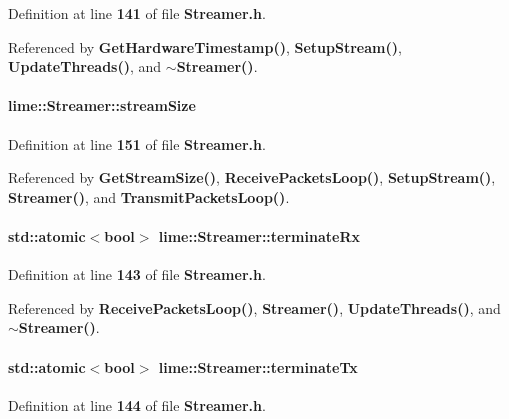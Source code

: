 Definition at line {\bf 141} of file {\bf Streamer.\+h}.



Referenced by {\bf Get\+Hardware\+Timestamp()}, {\bf Setup\+Stream()}, {\bf Update\+Threads()}, and {\bf $\sim$\+Streamer()}.

\paragraph[{stream\+Size}]{ lime\+::\+Streamer\+::stream\+Size}\label{classlime_1_1Streamer_a09f4d312f6ee5f04494455fe2fe7b482}


Definition at line {\bf 151} of file {\bf Streamer.\+h}.



Referenced by {\bf Get\+Stream\+Size()}, {\bf Receive\+Packets\+Loop()}, {\bf Setup\+Stream()}, {\bf Streamer()}, and {\bf Transmit\+Packets\+Loop()}.

\paragraph[{terminate\+Rx}]{\setlength{\rightskip}{0pt plus 5cm}std\+::atomic$<$bool$>$ lime\+::\+Streamer\+::terminate\+Rx}\label{classlime_1_1Streamer_a88834a0ea3ec6d9df65d75db0091fd28}


Definition at line {\bf 143} of file {\bf Streamer.\+h}.



Referenced by {\bf Receive\+Packets\+Loop()}, {\bf Streamer()}, {\bf Update\+Threads()}, and {\bf $\sim$\+Streamer()}.

\paragraph[{terminate\+Tx}]{\setlength{\rightskip}{0pt plus 5cm}std\+::atomic$<$bool$>$ lime\+::\+Streamer\+::terminate\+Tx}\label{classlime_1_1Streamer_ac08fdbdb56cbe888e14c0d9daece9ac5}


Definition at line {\bf 144} of file {\bf Streamer.\+h}.



